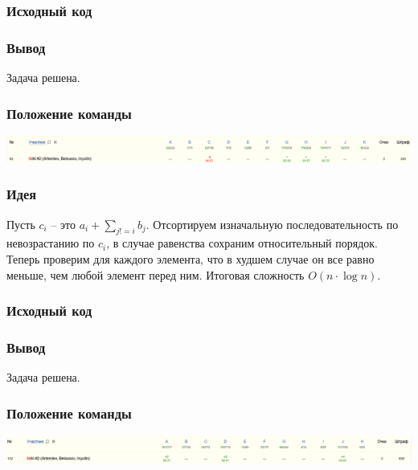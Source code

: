 \subsubsection*{Исходный код}

\subsubsection*{Вывод}
Задача решена.
\subsubsection*{Положение команды}
\includegraphics[scale=0.25]{images/220207.png}\newline\noindent
\pagebreak


\subsubsection*{Идея}
Пусть $c_i$ -- это $a_i + \sum_{j != i} b_j$. Отсортируем изначальную последовательность по невозрастанию по $c_i$, в случае равенства сохраним относительный порядок. Теперь проверим для каждого элемента, что в худшем случае он все равно меньше, чем любой элемент перед ним. Итоговая сложность $O(n\cdot \log{n})$.
\subsubsection*{Исходный код}

\subsubsection*{Вывод}
Задача решена.
\subsubsection*{Положение команды}
\includegraphics[scale=0.25]{images/220208.png}\newline\noindent
\pagebreak

